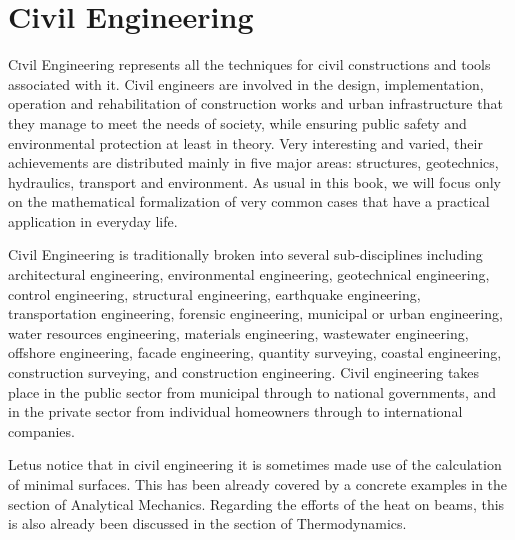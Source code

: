 	\newpage
	\thispagestyle{empty}
	\mbox{}
	\section{Civil Engineering}\label{civil engineering}
	\lettrine[lines=4]{\color{BrickRed}C}ivil Engineering represents all the techniques for civil constructions and tools associated with it. Civil engineers are involved in the design, implementation, operation and rehabilitation of construction works and urban infrastructure that they manage to meet the needs of society, while ensuring public safety and environmental protection at least in theory. Very interesting and varied, their achievements are distributed mainly in five major areas: structures, geotechnics, hydraulics, transport and environment. As usual in this book, we will focus only on the mathematical formalization of very common cases that have a practical application in everyday life.
	
	Civil Engineering is traditionally broken into several sub-disciplines including architectural engineering, environmental engineering, geotechnical engineering, control engineering, structural engineering, earthquake engineering, transportation engineering, forensic engineering, municipal or urban engineering, water resources engineering, materials engineering, wastewater engineering, offshore engineering, facade engineering, quantity surveying, coastal engineering, construction surveying, and construction engineering. Civil engineering takes place in the public sector from municipal through to national governments, and in the private sector from individual homeowners through to international companies.
	
	Letus notice that in civil engineering it is sometimes made use of the calculation of minimal surfaces. This has been already covered by a concrete examples in the section of Analytical Mechanics. Regarding the efforts of the heat on beams, this is also already been discussed in the section of Thermodynamics.
	
